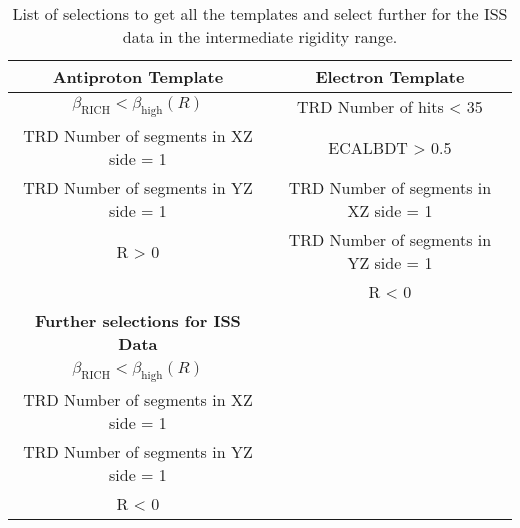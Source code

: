 \begin{table}[htbp]
\setlength\tabcolsep{15pt}
\centering
\caption{List of selections to get all the templates and select further for the ISS data in the intermediate rigidity range.} 
\label{IntermediateRigiditySelectionsForTemplates}
\begin{tabular}{cc}
\hline \textbf{Antiproton Template}      &  \textbf{Electron Template}           \\
\hline $\beta_\mathrm{RICH}<\beta_\mathrm{high}(R)$                                             &   TRD Number of hits < 35                          \\
\hline TRD Number of segments in XZ side = 1                                                                  &   ECALBDT > 0.5                                         \\
\hline TRD Number of segments in YZ side = 1                                                                  &   TRD Number of segments in XZ side = 1         \\
\hline R > 0                                                                                                                   &   TRD Number of segments in YZ side = 1        \\
\hline                                                                                                                            & R < 0                                                           \\
\hline \textbf{Further selections for ISS Data}                                                                            &        \\
\hline  $\beta_\mathrm{RICH}<\beta_\mathrm{high}(R)$                                            &        \\
\hline  TRD Number of segments in XZ side = 1                                                                 &        \\
\hline  TRD Number of segments in YZ side = 1                                                                  &        \\
\hline  R < 0                                                                                                                   &        \\
\hline
\end{tabular}
\end{table}

